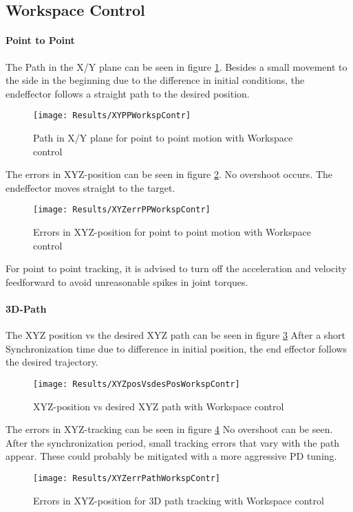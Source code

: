 \subsection{Workspace Control}

\paragraph{Point to Point}
The Path in the X/Y plane can be seen in figure  \ref{fig:XYPPWorkspContr}. 
Besides a small movement to the side in the beginning due to the difference in initial conditions, the endeffector follows a straight path to the desired position.
\begin{figure}[H]
	\texttt{[image: Results/XYPPWorkspContr]}
	\caption{Path in X/Y plane for point to point motion with Workspace control}
	\label{fig:XYPPWorkspContr}
\end{figure}
The errors in XYZ-position can be seen in figure \ref{fig:XYZerrPPWorkspContr}.
No overshoot occurs. The endeffector moves straight to the target.
\begin{figure}[H]
	\texttt{[image: Results/XYZerrPPWorkspContr]}
	\caption{Errors in XYZ-position for point to point motion with Workspace control}
	\label{fig:XYZerrPPWorkspContr}
\end{figure}

For point to point tracking, it is advised to turn off the acceleration and velocity feedforward to avoid unreasonable spikes in joint torques.

\paragraph{3D-Path}
The XYZ position vs the desired XYZ path can be seen in figure \ref{fig:XYZposVsdesPosWorkspContr}
After a short Synchronization time due to difference in initial position, the end effector follows the desired trajectory.
\begin{figure}[H]
	\texttt{[image: Results/XYZposVsdesPosWorkspContr]}
	\caption{XYZ-position vs desired XYZ path with Workspace control}
	\label{fig:XYZposVsdesPosWorkspContr}
\end{figure}
The errors in XYZ-tracking can be seen in figure \ref{fig:XYZerrPathWorkspContr}
No overshoot can be seen. After the synchronization period, small tracking errors that vary with the path appear. These could probably be mitigated with a more aggressive PD tuning.
\begin{figure}[H]
	\texttt{[image: Results/XYZerrPathWorkspContr]}
	\caption{Errors in XYZ-position for 3D path tracking with Workspace control}
	\label{fig:XYZerrPathWorkspContr}
\end{figure}



